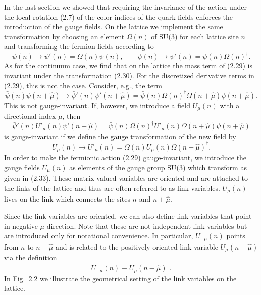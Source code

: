 In the last section we showed that requiring the invariance of the action
under the local rotation (2.7) of the color indices of the quark fields
enforces the introduction of the gauge fields. On the lattice we implement
the same transformation by choosing an element $\Omega(n)$ of SU(3) for each
lattice site $n$ and transforming the fermion fields according to
\begin{equation}
  \psi(n) \to \psi'(n) = \Omega(n) \psi(n) , \qquad
  \bar\psi(n) \to \bar\psi'(n) = \bar\psi(n) \Omega(n)^\dagger .
\end{equation}
As for the continuum case, we find that on the lattice the mass term of
(2.29) is invariant under the transformation (2.30). For the discretized
derivative terms in (2.29), this is not the case. Consider, e.g., the term
\begin{equation}
  \bar\psi(n)\psi(n + \hat\mu) \to
  \bar\psi'(n) \psi'(n + \hat\mu) =
  \bar\psi(n) \Omega(n)^\dagger \Omega(n + \hat\mu) \psi(n + \hat\mu) .
\end{equation}
This is not gauge-invariant. If, however, we introduce a field $U_\mu(n)$
with a directional index $\mu$, then
\begin{equation}
  \bar\psi'(n) U'_\mu(n) \psi'(n + \hat\mu) =
  \bar\psi(n) \Omega(n)^\dagger U'_\mu(n) \Omega(n + \hat\mu)
  \psi(n + \hat\mu)
\end{equation}
is gauge-invariant if we define the gauge transformation of the new field by
\begin{equation}
  U_\mu(n) \to U'_\mu(n) = \Omega(n) U_\mu(n) \Omega(n + \hat\mu)^\dagger .
\end{equation}
In order to make the fermionic action (2.29) gauge-invariant, we introduce
the gauge fields $U_\mu(n)$ as elements of the gauge group SU(3) which
transform as given in (2.33). These matrix-valued variables are oriented and
are attached to the links of the lattice and thus are often referred to as
link variables. $U_\mu(n)$ lives on the link which connects the sites $n$
and $n + \hat\mu$.

Since the link variables are oriented, we can also define link variables
that point in negative $\mu$ direction. Note that these are not independent
link variables but are introduced only for notational convenience. In
particular, $U_{-\mu}(n)$ points from $n$ to $n - \hat\mu$ and is related to
the positively oriented link variable $U_\mu(n - \hat\mu)$ via the definition
\begin{equation}
  U_{-\mu}(n) \equiv U_\mu(n - \hat\mu)^\dagger .
\end{equation}
In Fig.~2.2 we illustrate the geometrical setting of the link variables on
the lattice.

